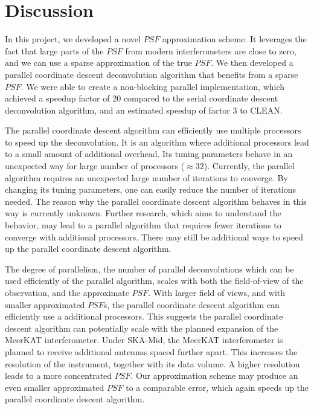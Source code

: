\section{Discussion}\label{discussion}
In this project, we developed a novel $PSF$ approximation scheme. It leverages the fact that large parts of the $PSF$ from modern interferometers are close to zero, and we can use a sparse approximation of the true $PSF$. We then developed a parallel coordinate descent deconvolution algorithm that benefits from a sparse $PSF$.  We were able to create a non-blocking parallel implementation, which achieved a speedup factor of 20 compared to the serial coordinate descent deconvolution algorithm, and an estimated speedup of factor 3 to CLEAN.

The parallel coordinate descent algorithm can efficiently use multiple processors to speed up the deconvolution. It is an algorithm where additional processors lead to a small amount of additional overhead. Its tuning parameters behave in an unexpected way for large number of processors ($\approx 32$). Currently, the parallel algorithm requires an unexpected large number of iterations to converge. By changing its tuning parameters, one can easily reduce the number of iterations needed. The reason why the parallel coordinate descent algorithm behaves in this way is currently unknown. Further research, which aims to understand the behavior, may lead to a parallel algorithm that requires fewer iterations to converge with additional processors. There may still be additional ways to speed up the parallel coordinate descent algorithm.

The degree of parallelism, the number of parallel deconvolutions which can be used efficiently of the parallel algorithm, scales with both the field-of-view of the observation, and the approximate $PSF$. With larger field of views, and with smaller approximated $PSF$s, the parallel coordinate descent algorithm can efficiently use a additional processors. This suggests the parallel coordinate descent algorithm can potentially scale with the planned expansion of the MeerKAT interferometer. Under SKA-Mid, the MeerKAT interferometer is planned to receive additional antennas spaced further apart. This increases the resolution of the instrument, together with its data volume. A higher resolution leads to a more concentrated $PSF$. Our approximation scheme may produce an even smaller approximated $PSF$ to a comparable error, which again speeds up the parallel coordinate descent algorithm.

